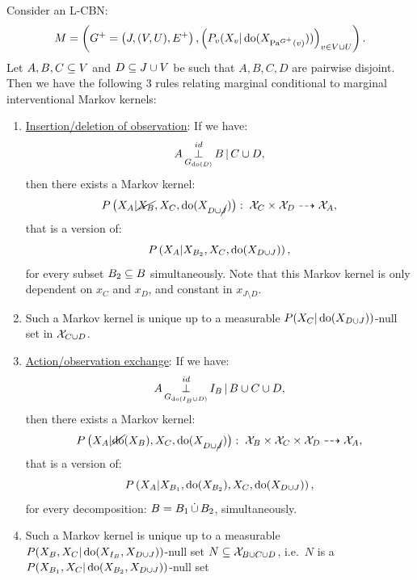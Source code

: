 \begin{Prp}
    \label{prp:do-calculus}
    Consider an L-CBN:
    \[M= \left ( G^+=\left ( J,(V,U),E^+ \right ), \left ( P_v ( X_v|\operatorname{do}( X_{\mathrm{Pa}^{G^+}(v)})) \right )_{v \in V \cup U} \right ).\]
    Let $A,B,C \subseteq V$ and $D \subseteq J \cup V$ be such that $A,B,C,D$ are pairwise disjoint.\\
    Then we have the following 3 rules relating marginal conditional to marginal interventional Markov kernels:
    \begin{enumerate}
        \item \underline{Insertion/deletion of observation}: If we have:
            \[ A \operatorname*{\perp}^{id}_{G_{\operatorname{do}(D)}} B \operatorname*{|} C \cup D,   \]
            then there exists a Markov kernel:
            \[ P\left ( X_A|\cancel{X_B},X_C,\operatorname{do}(X_{D\cup \cancel{J}})\right ):\;  \mathcal{X}_C \times \mathcal{X}_{D} \dashrightarrow \mathcal{X}_A, \]
            that is a version of:
            \[P\left ( X_A|X_{B_2},X_C,\operatorname{do}(X_{D\cup J})\right ),\] 
            for every subset $B_2 \subseteq B$ simultaneously.
            Note that this Markov kernel is only dependent on $x_C$ and $x_D$, and constant in $x_{J\setminus D}$.
        \item[] Such a Markov kernel is unique up to a measurable $P(X_C|\operatorname{do}(X_{D\cup J}))$-null set in $\mathcal{X}_{C\cup D}$. 
         \item \underline{Action/observation exchange}: If we have:
            \[ A \operatorname*{\perp}^{id}_{G_{\operatorname{do}(I_B \cup D)}} I_B \operatorname*{|} B \cup C \cup D,   \]
            then there exists a Markov kernel:
            \[P\left ( X_A|\cancel{\operatorname{do}}(X_B),X_C,\operatorname{do}(X_{D\cup \cancel{J}})\right ): \;\mathcal{X}_B \times \mathcal{X}_C \times \mathcal{X}_{D} \dashrightarrow \mathcal{X}_A,\]
            that is a version of:            
            \[ P\left ( X_A|X_{B_1},\operatorname{do}(X_{B_2}),X_C,\operatorname{do}(X_{D\cup J})\right ), \]
            for every decomposition: $B=B_1\,\dot{\cup}\, B_2$, simultaneously.
        \item[] Such a Markov kernel is unique up to a measurable $P(X_B,X_C|\operatorname{do}(X_{I_B},X_{D\cup J}))$-null set $N \subseteq \mathcal{X}_{B \cup C\cup D}$, i.e.\ $N$ is a $P(X_{B_1},X_C|\operatorname{do}(X_{B_2},X_{D\cup J}))$-null set

\end{enumerate}
\end{Prp}
